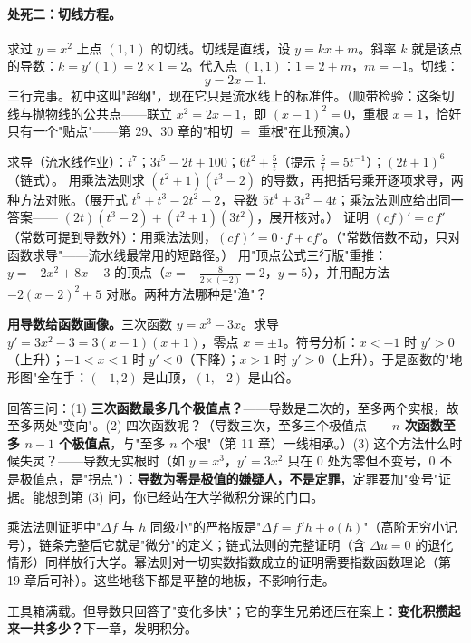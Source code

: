 \paragraph{处死二：切线方程。}求过 $y = x^2$ 上点 $(1,1)$ 的切线。切线是直线，设 $y = kx + m$。斜率 $k$ 就是该点的导数：$k = y'(1) = 2\times1 = 2$。代入点 $(1,1)$：$1 = 2 + m$，$m = -1$。切线：
\[
y = 2x - 1 .
\]
三行完事。初中这叫"超纲"，现在它只是流水线上的标准件。（顺带检验：这条切线与抛物线的公共点——联立 $x^2 = 2x - 1$，即 $(x-1)^2 = 0$，重根 $x=1$，恰好只有一个"贴点"——第 29、30 章的"相切 $=$ 重根"在此预演。）

\begin{dongshou}
\begin{itemize}
  \yisi 求导（流水线作业）：$t^7$；$3t^5 - 2t + 100$；$6t^2 + \tfrac5t$（提示 $\tfrac5t = 5t^{-1}$）；$(2t+1)^6$（链式）。
  \yier 用乘法法则求 $(t^2+1)(t^3-2)$ 的导数，再把括号乘开逐项求导，两种方法对账。（展开式 $t^5 + t^3 - 2t^2 - 2$，导数 $5t^4 + 3t^2 - 4t$；乘法法则应给出同一答案—— $(2t)(t^3-2) + (t^2+1)(3t^2)$，展开核对。）
  \yier 证明 $(cf)' = c\,f'$（常数可提到导数外）：用乘法法则，$(cf)' = 0\cdot f + c f'$。（"常数倍数不动，只对函数求导"——流水线最常用的短路径。）
  \yier 用"顶点公式三行版"重推：$y = -2x^2 + 8x - 3$ 的顶点（$x = -\tfrac{8}{2\times(-2)} = 2$，$y = 5$），并用配方法 $-2(x-2)^2+5$ 对账。两种方法哪种是"渔"？
\end{itemize}
\end{dongshou}

\begin{shaonao}
\textbf{用导数给函数画像。}三次函数 $y = x^3 - 3x$。求导 $y' = 3x^2 - 3 = 3(x-1)(x+1)$，零点 $x = \pm1$。符号分析：$x < -1$ 时 $y' > 0$（上升）；$-1 < x < 1$ 时 $y' < 0$（下降）；$x > 1$ 时 $y' > 0$（上升）。于是函数的"地形图"全在手：$(-1, 2)$ 是山顶，$(1, -2)$ 是山谷。

回答三问：(1) \textbf{三次函数最多几个极值点？}——导数是二次的，至多两个实根，故至多两处"变向"。(2) 四次函数呢？（导数三次，至多三个极值点——\textbf{$n$ 次函数至多 $n-1$ 个极值点}，与"至多 $n$ 个根"（第 11 章）一线相承。）(3) 这个方法什么时候失灵？——导数无实根时（如 $y = x^3$，$y' = 3x^2$ 只在 $0$ 处为零但不变号，$0$ 不是极值点，是"拐点"）：\textbf{导数为零是极值的嫌疑人，不是定罪}，定罪要加"变号"证据。能想到第 (3) 问，你已经站在大学微积分课的门口。
\end{shaonao}

\begin{chengshi}
乘法法则证明中"$\Delta f$ 与 $h$ 同级小"的严格版是"$\Delta f = f'h + o(h)$"（高阶无穷小记号），链条完整后它就是"微分"的定义；链式法则的完整证明（含 $\Delta u = 0$ 的退化情形）同样放行大学。幂法则对一切实数指数成立的证明需要指数函数理论（第 19 章后可补）。这些地毯下都是平整的地板，不影响行走。
\end{chengshi}

工具箱满载。但导数只回答了"变化多快"；它的孪生兄弟还压在案上：\textbf{变化积攒起来一共多少？}下一章，发明积分。
